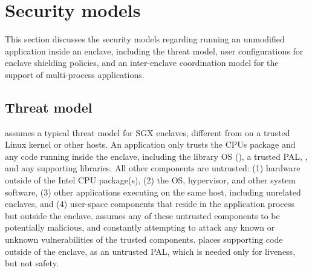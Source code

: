 \section{Security models}
\label{sec:sgx:security}

This section discusses 
the security models regarding running an unmodified application
inside an enclave, including the threat model,
user configurations for enclave shielding policies,
and an inter-enclave coordination model for the support of
multi-process applications.




\subsection{Threat model}
\label{sec:sgx:overview:threat}

\graphenesgx{} assumes a typical threat model for SGX enclaves, different from \graphene{} on a trusted Linux kernel or other hosts.
An application only trusts the CPUs package and any code running inside the enclave, including the library OS (\thelibos{}), a trusted PAL, \libc{}, and any supporting libraries. 
All other components are untrusted:
(1) hardware outside of the Intel CPU package(s),
(2) the OS, hypervisor, and other system software,
(3) other applications executing on the same host, including unrelated enclaves,
and (4) user-space components that
reside in the application process but outside the enclave.
\graphenesgx{}
assumes any of these untrusted components to be potentially malicious,
and constantly attempting to attack
any known or unknown vulnerabilities of the trusted components.
\graphenesgx{} places supporting code outside of the enclave, as an untrusted PAL, which is needed
only for liveness, but not safety.





